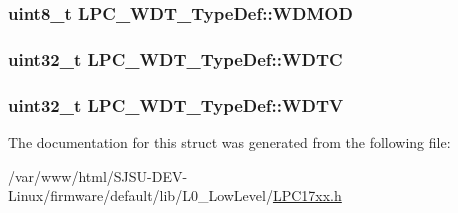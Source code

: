 \subsubsection[{\texorpdfstring{W\+D\+M\+OD}{WDMOD}}]{ uint8\+\_\+t L\+P\+C\+\_\+\+W\+D\+T\+\_\+\+Type\+Def\+::\+W\+D\+M\+OD}\hypertarget{structLPC__WDT__TypeDef_a43d97828d135ab2479191efbcde299ad}{}\label{structLPC__WDT__TypeDef_a43d97828d135ab2479191efbcde299ad}
\subsubsection[{\texorpdfstring{W\+D\+TC}{WDTC}}]{ uint32\+\_\+t L\+P\+C\+\_\+\+W\+D\+T\+\_\+\+Type\+Def\+::\+W\+D\+TC}\hypertarget{structLPC__WDT__TypeDef_a3f3785da39c5efbfbe5f615a23b36d17}{}\label{structLPC__WDT__TypeDef_a3f3785da39c5efbfbe5f615a23b36d17}
\subsubsection[{\texorpdfstring{W\+D\+TV}{WDTV}}]{ uint32\+\_\+t L\+P\+C\+\_\+\+W\+D\+T\+\_\+\+Type\+Def\+::\+W\+D\+TV}\hypertarget{structLPC__WDT__TypeDef_a30e695a8014d4d6e61ef9eaf15a967dc}{}\label{structLPC__WDT__TypeDef_a30e695a8014d4d6e61ef9eaf15a967dc}


The documentation for this struct was generated from the following file\+:\begin{DoxyCompactItemize}
\item 
/var/www/html/\+S\+J\+S\+U-\/\+D\+E\+V-\/\+Linux/firmware/default/lib/\+L0\+\_\+\+Low\+Level/\hyperlink{LPC17xx_8h}{L\+P\+C17xx.\+h}\end{DoxyCompactItemize}
